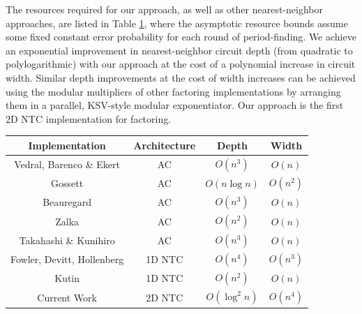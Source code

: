 \documentclass[twoside]{article}
\begin{document}
The resources required for our approach,
as well as other nearest-neighbor approaches,
are listed in Table \ref{tab:results},
where the asymptotic resource bounds assume some fixed constant error
probability for each round of period-finding.
We achieve an exponential
improvement in nearest-neighbor circuit depth (from quadratic to polylogarithmic)
with our approach at the cost of a polynomial increase in
circuit width. Similar depth improvements at the cost of width increases can be achieved using the modular multipliers
of other factoring implementations
by arranging them in a parallel, KSV-style modular exponentiator.
Our approach is the first 2D NTC implementation for factoring.
%
\begin{table}[htb!]
\begin{center}
\begin{tabular}{|c|c|c|c|}
\hline
Implementation             & Architecture      & Depth             & Width     \\
\hline
Vedral, Barenco \& Ekert \cite{Vedral1996}   & \textsc{AC}       & $O(n^3)$      & $O(n)$ \\
Gossett \cite{Gossett1998}                   & \textsc{AC}       & $O(n \log n)$ & $O(n^2)$  \\
Beauregard \cite{Beauregard2002}                & \textsc{AC}       & $O(n^3)$      & $O(n)$ \\
Zalka \cite{Zalka1998}                     & \textsc{AC}       & $O(n^2)$      & $O(n)$     \\
Takahashi \& Kunihiro \cite{Takahashi2006}     & \textsc{AC}       & $O(n^3)$      & $O(n)$ \\
\hline
Fowler, Devitt, Hollenberg \cite{Fowler2004} & \textsc{1D NTC}   & $O(n^4)$ & $O(n^3)$\\
Kutin \cite{Kutin2006}                     & \textsc{1D NTC}   & $O(n^2)$ & $O(n)$\\
\hline
Current Work               & \textsc{2D NTC}   & $O(\log^2{n})$ & $O(n^4)$   \\
\hline
\end{tabular}
\end{center}
\label{tab:results}
\end{table}
\end{document}

